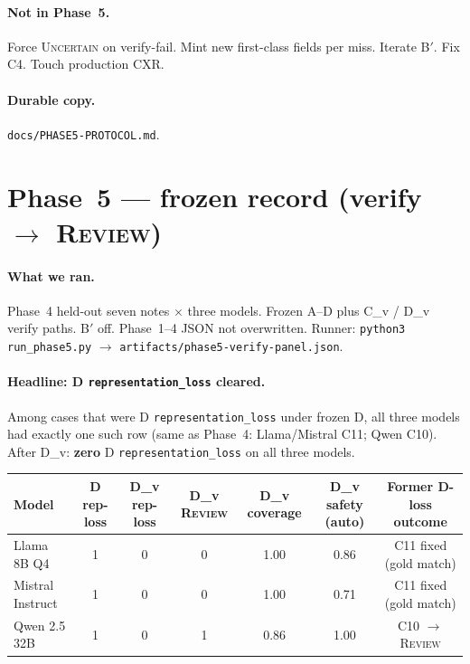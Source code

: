 \documentclass[11pt,a4paper]{article}
\newcommand{\unc}{\textsc{Uncertain}}
\newcommand{\rev}{\textsc{Review}}
\begin{document}
\paragraph{Not in Phase~5.}
Force \unc{} on verify-fail. Mint new first-class fields per miss. Iterate B$'$. Fix C4. Touch production CXR.

\paragraph{Durable copy.}
\texttt{docs/PHASE5-PROTOCOL.md}.

\section{Phase~5 --- frozen record (verify $\rightarrow$ \rev)}

\paragraph{What we ran.}
Phase~4 held-out seven notes $\times$ three models.
Frozen A--D plus C\_v / D\_v verify paths.
B$'$ off. Phase~1--4 JSON not overwritten.
Runner: \texttt{python3 run\_phase5.py} $\rightarrow$ \texttt{artifacts/phase5-verify-panel.json}.

\paragraph{Headline: D \texttt{representation\_loss} cleared.}
Among cases that were D \texttt{representation\_loss} under frozen D, all three models had exactly one such row (same as Phase~4: Llama/Mistral C11; Qwen C10).
After D\_v: \textbf{zero} D \texttt{representation\_loss} on all three models.

\begin{center}
\small
\begin{tabular}{lcccccc}
\toprule
Model & D rep-loss & D\_v rep-loss & D\_v \rev & D\_v coverage & D\_v safety (auto) & Former D-loss outcome \\
\midrule
Llama 8B Q4 & 1 & 0 & 0 & 1.00 & 0.86 & C11 fixed (gold match) \\
Mistral Instruct & 1 & 0 & 0 & 1.00 & 0.71 & C11 fixed (gold match) \\
Qwen 2.5 32B & 1 & 0 & 1 & 0.86 & 1.00 & C10 $\rightarrow$ \rev \\
\bottomrule
\end{tabular}
\end{center}
\end{document}
